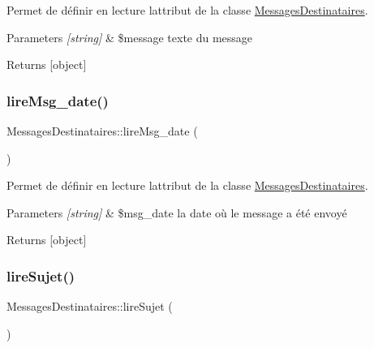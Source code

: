 Permet de définir en lecture l\textquotesingle{}attribut de la classe \hyperlink{class_messages_destinataires}{Messages\+Destinataires}. 


\begin{DoxyParams}{Parameters}
{\em \mbox{[}string\mbox{]}} & \$message texte du message \\
\hline
\end{DoxyParams}
\begin{DoxyReturn}{Returns}
\mbox{[}object\mbox{]} 
\end{DoxyReturn}
\mbox{\label{class_messages_destinataires_a196017b65c12938cc763c8e08df8b1dd}} 
\subsubsection{\texorpdfstring{lire\+Msg\+\_\+date()}{lireMsg\_date()}}
{\footnotesize\ttfamily Messages\+Destinataires\+::lire\+Msg\+\_\+date (\begin{DoxyParamCaption}{ }\end{DoxyParamCaption})}



Permet de définir en lecture l\textquotesingle{}attribut de la classe \hyperlink{class_messages_destinataires}{Messages\+Destinataires}. 


\begin{DoxyParams}{Parameters}
{\em \mbox{[}string\mbox{]}} & \$msg\+\_\+date la date où le message a été envoyé \\
\hline
\end{DoxyParams}
\begin{DoxyReturn}{Returns}
\mbox{[}object\mbox{]} 
\end{DoxyReturn}
\mbox{\label{class_messages_destinataires_a0a7e2a3bd0e884f19c150095141dccb0}} 
\subsubsection{\texorpdfstring{lire\+Sujet()}{lireSujet()}}
{\footnotesize\ttfamily Messages\+Destinataires\+::lire\+Sujet (\begin{DoxyParamCaption}{ }\end{DoxyParamCaption})}



